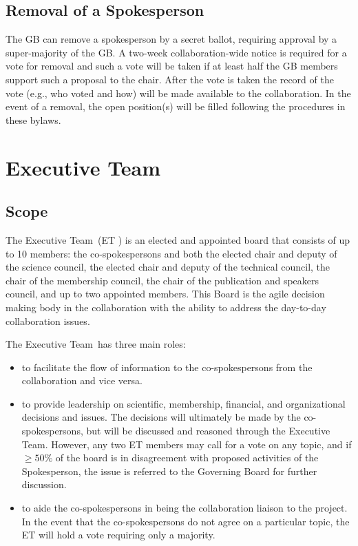 \documentclass[12pt]{article}
\newcommand{\exec}{{Executive Team}}
\newcommand{\shorte}{{ET }}  %
\begin{document}
\subsection{Removal of a Spokesperson}

The GB can remove a spokesperson by a secret ballot, requiring approval by a super-majority of the GB. A two-week collaboration-wide notice is required for a vote for removal and such a vote will be taken if at least half the GB members support such a proposal to the chair. After the vote is taken the record of the vote (e.g., who voted and how) will be made available to the collaboration. In the event of a removal, the open position(s) will be filled following the procedures in these bylaws.


\section{\exec}
\label{sec:exec}

\subsection{Scope}

The \exec \ (\shorte) is an elected and appointed board that consists of up to 10 members: the co-spokespersons and both the elected chair and deputy of the science council, the elected chair and deputy of the technical council, the chair of the membership council, the chair of the publication and speakers council, and up to two appointed members. This Board is the agile decision making body in the collaboration with the ability to address the day-to-day collaboration issues. 

The \exec \ has three main roles:
\begin{itemize}
\item to facilitate the flow of information to the co-spokespersons from the collaboration and vice versa.

\item to provide leadership on scientific, membership, financial, and organizational decisions and issues. The decisions will ultimately be made by the co-spokespersons, but will be discussed and reasoned through the \exec.  However, any two \shorte members may call for a vote on any topic, and if $\geq 50\%$ of the board is in disagreement with proposed activities of the Spokesperson, the issue is referred to the Governing Board for further discussion. 

\item to aide the co-spokespersons in being the collaboration liaison to the project. In the event that the co-spokespersons do not agree on a particular topic, the \shorte will hold a vote requiring only a majority.

\end{itemize}
\end{document}
